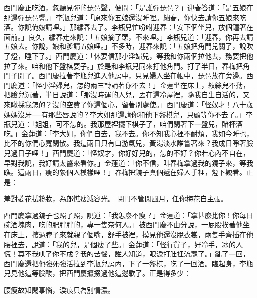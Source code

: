 西門慶正吃酒，忽聽見彈的琵琶聲，便問：「是誰彈琵琶？」迎春答道：「是五娘在那邊彈琵琶響。」李瓶兒道：「原來你五娘還沒睡哩。繡春，你快去請你五娘來吃酒。你說俺娘請哩。」那繡春去了。李瓶兒忙吩咐迎春：「安下個坐兒，放個鐘箸在面前。」良久，繡春走來說：「五娘摘了頭，不來哩。」李瓶兒道：「迎春，你再去請五娘去。你說，娘和爹請五娘哩。」不多時，迎春來說：「五娘把角門兒關了，說吹了燈，睡下了。」西門慶道：「休要信那小淫婦兒，等我和你兩個拉他去，務要把他拉了來。咱和他下盤棋耍子。」於是和李瓶兒同來打他角門。打了半日，春梅把角門子開了。西門慶拉著李瓶兒進入他房中，只見婦人坐在帳中，琵琶放在旁邊。西門慶道：「怪小淫婦兒，怎的兩三轉請著你不去！」金蓮坐在床上，紋絲兒不動，把臉兒沉著，半日說道：「那沒時運的人兒，丟在這冷屋裡，隨我自生自活的，又來瞅採我怎的？沒的空費了你這個心，留著別處使。」西門慶道：「怪奴才！八十歲媽媽沒牙──有那些唇說的？李大姐那邊請你和他下盤棋兒，只顧等你不去了。」李瓶兒道：「姐姐，可不怎的。我那屋裡擺下棋子了，咱們閑著下一盤兒，賭杯酒吃。」金蓮道：「李大姐，你們自去，我不去。你不知我心裡不耐煩，我如今睡也，比不的你們心寬閑散。我這兩日只有口游氣兒，黃湯淡水誰嘗著來？我成日睜著臉兒過日子哩！」西門慶道：「怪奴才，你好好兒的，怎的不好？你若心內不自在，早對我說，我好請太醫來看你。」金蓮道：「你不信，叫春梅拿過我的鏡子來，等我瞧。這兩日，瘦的象個人模樣哩！」春梅把鏡子真個遞在婦人手裡，燈下觀看。正是：

羞對菱花拭粉妝，為郎憔瘦減容光。
閉門不管閑風月，任你梅花自主張。

西門慶拿過鏡子也照了照，說道：「我怎麼不瘦？」金蓮道：「拿甚麼比你！你每日碗酒塊肉，吃的肥胖胖的，專一隻奈何人。」被西門慶不由分說，一屁股挨著他坐在床上，摟過脖子來就親了個嘴，舒手被裡，摸見他還沒脫衣裳，兩隻手齊插在他腰裡去，說道：「我的兒，是個瘦了些。」金蓮道：「怪行貨子，好冷手，冰的人慌！莫不我哄了你不成？我的苦惱，誰人知道，眼淚打肚裡流罷了。」亂了一回，西門慶還把他強死強活拉到李瓶兒房內，下了一盤棋，吃了一回酒。臨起身，李瓶兒見他這等臉酸，把西門慶攛掇過他這邊歇了。正是得多少：

腰瘦故知閑事惱，淚痕只為別情濃。


